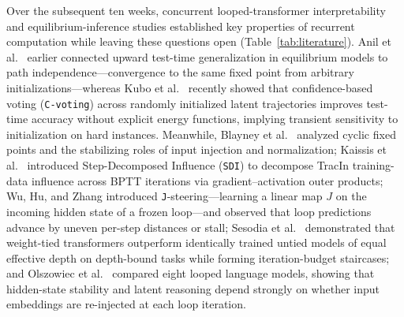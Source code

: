 \documentclass[10pt,letterpaper]{article}
\begin{document}
Over the subsequent ten weeks, concurrent looped-transformer interpretability and equilibrium-inference studies established key properties of recurrent computation while leaving these questions open (Table~\ref{tab:literature}). Anil et al.\ \cite{anil2022path} earlier connected upward test-time generalization in equilibrium models to path independence—convergence to the same fixed point from arbitrary initializations—whereas Kubo et al.\ \cite{kubo2026cvoting} recently showed that confidence-based voting (\texttt{C-voting}) across randomly initialized latent trajectories improves test-time accuracy without explicit energy functions, implying transient sensitivity to initialization on hard instances. Meanwhile, Blayney et al.\ \cite{blayney2026mechanistic} analyzed cyclic fixed points and the stabilizing roles of input injection and normalization; Kaissis et al.\ \cite{kaissis2026sdi} introduced Step-Decomposed Influence (\texttt{SDI}) to decompose TracIn training-data influence across BPTT iterations via gradient--activation outer products; Wu, Hu, and Zhang \cite{wu2026shared} introduced \texttt{J}-steering—learning a linear map $J$ on the incoming hidden state of a frozen loop—and observed that loop predictions advance by uneven per-step distances or stall; Sesodia et al.\ \cite{sesodia2026inside} demonstrated that weight-tied transformers outperform identically trained untied models of equal effective depth on depth-bound tasks while forming iteration-budget staircases; and Olszowiec et al.\ \cite{olszowiec2026monitoring} compared eight looped language models, showing that hidden-state stability and latent reasoning depend strongly on whether input embeddings are re-injected at each loop iteration.
\end{document}
